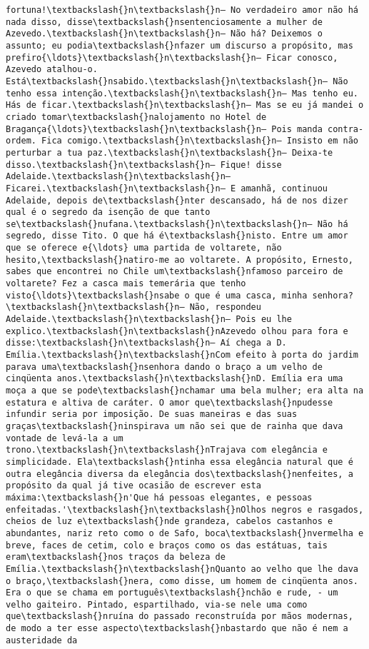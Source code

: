 \begin{Verbatim}[commandchars=\\\{\}]
fortuna!\textbackslash{}n\textbackslash{}n— No verdadeiro amor não há nada disso, disse\textbackslash{}nsentenciosamente a mulher de Azevedo.\textbackslash{}n\textbackslash{}n— Não há? Deixemos o assunto; eu podia\textbackslash{}nfazer um discurso a propósito, mas prefiro{\ldots}\textbackslash{}n\textbackslash{}n— Ficar conosco, Azevedo atalhou-o. Está\textbackslash{}nsabido.\textbackslash{}n\textbackslash{}n— Não tenho essa intenção.\textbackslash{}n\textbackslash{}n— Mas tenho eu. Hás de ficar.\textbackslash{}n\textbackslash{}n— Mas se eu já mandei o criado tomar\textbackslash{}nalojamento no Hotel de Bragança{\ldots}\textbackslash{}n\textbackslash{}n— Pois manda contra-ordem. Fica comigo.\textbackslash{}n\textbackslash{}n— Insisto em não perturbar a tua paz.\textbackslash{}n\textbackslash{}n— Deixa-te disso.\textbackslash{}n\textbackslash{}n— Fique! disse Adelaide.\textbackslash{}n\textbackslash{}n— Ficarei.\textbackslash{}n\textbackslash{}n— E amanhã, continuou Adelaide, depois de\textbackslash{}nter descansado, há de nos dizer qual é o segredo da isenção de que tanto se\textbackslash{}nufana.\textbackslash{}n\textbackslash{}n— Não há segredo, disse Tito. O que há é\textbackslash{}nisto. Entre um amor que se oferece e{\ldots} uma partida de voltarete, não hesito,\textbackslash{}natiro-me ao voltarete. A propósito, Ernesto, sabes que encontrei no Chile um\textbackslash{}nfamoso parceiro de voltarete? Fez a casca mais temerária que tenho visto{\ldots}\textbackslash{}nsabe o que é uma casca, minha senhora?\textbackslash{}n\textbackslash{}n— Não, respondeu Adelaide.\textbackslash{}n\textbackslash{}n— Pois eu lhe explico.\textbackslash{}n\textbackslash{}nAzevedo olhou para fora e disse:\textbackslash{}n\textbackslash{}n— Aí chega a D. Emília.\textbackslash{}n\textbackslash{}nCom efeito à porta do jardim parava uma\textbackslash{}nsenhora dando o braço a um velho de cinqüenta anos.\textbackslash{}n\textbackslash{}nD. Emília era uma moça a que se pode\textbackslash{}nchamar uma bela mulher; era alta na estatura e altiva de caráter. O amor que\textbackslash{}npudesse infundir seria por imposição. De suas maneiras e das suas graças\textbackslash{}ninspirava um não sei que de rainha que dava vontade de levá-la a um trono.\textbackslash{}n\textbackslash{}nTrajava com elegância e simplicidade. Ela\textbackslash{}ntinha essa elegância natural que é outra elegância diversa da elegância dos\textbackslash{}nenfeites, a propósito da qual já tive ocasião de escrever esta máxima:\textbackslash{}n'Que há pessoas elegantes, e pessoas enfeitadas.'\textbackslash{}n\textbackslash{}nOlhos negros e rasgados, cheios de luz e\textbackslash{}nde grandeza, cabelos castanhos e abundantes, nariz reto como o de Safo, boca\textbackslash{}nvermelha e breve, faces de cetim, colo e braços como os das estátuas, tais eram\textbackslash{}nos traços da beleza de Emília.\textbackslash{}n\textbackslash{}nQuanto ao velho que lhe dava o braço,\textbackslash{}nera, como disse, um homem de cinqüenta anos. Era o que se chama em português\textbackslash{}nchão e rude, - um velho gaiteiro. Pintado, espartilhado, via-se nele uma como que\textbackslash{}nruína do passado reconstruída por mãos modernas, de modo a ter esse aspecto\textbackslash{}nbastardo que não é nem a austeridade da 
\end{Verbatim}
